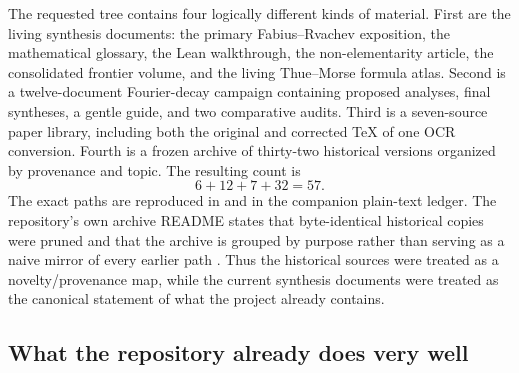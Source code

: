 \documentclass[11pt]{article}
\numberwithin{equation}{section}
\theoremstyle{definition}
\theoremstyle{remark}
\begin{document}
The requested tree contains four logically different kinds of material.
First are the living synthesis documents: the primary Fabius--Rvachev exposition, the
mathematical glossary, the Lean walkthrough, the non-elementarity article, the consolidated
frontier volume, and the living Thue--Morse formula atlas.  Second is a twelve-document
Fourier-decay campaign containing proposed analyses, final syntheses, a gentle guide, and two
comparative audits.  Third is a seven-source paper library, including both the original and
corrected TeX of one OCR conversion.  Fourth is a frozen archive of thirty-two historical
versions organized by provenance and topic.  The resulting count is
\[
 6+12+7+32=57.
\]
The exact paths are reproduced in  and in the companion plain-text
ledger.  The repository's own archive README states that byte-identical historical copies
were pruned and that the archive is grouped by purpose rather than serving as a naive mirror
of every earlier path \cite{p10:proveitArchive}.  Thus the historical sources were treated as a
novelty/provenance map, while the current synthesis documents were treated as the canonical
statement of what the project already contains.

\subsection{What the repository already does very well}
\end{document}
